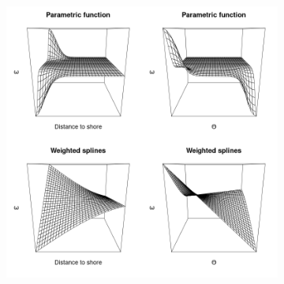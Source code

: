 \documentclass[aoas]{imsart}
\theoremstyle{definition}
\theoremstyle{remark}
\theoremstyle{remark}
\newcommand {\1}{\mathbb{1}}
\begin{document}
\begin{figure}[ht!]
	\centering
	\begin{subfigure}{0.48\textwidth}
		\includegraphics[scale=0.25]{images/crcvm/combined_persp_plots.png}
		\caption{}
		\label{fig: combinedperspplots}
	\end{subfigure}
	\begin{subfigure}{0.48\textwidth}
		\centering
\end{subfigure}
\end{figure}
\end{document}

